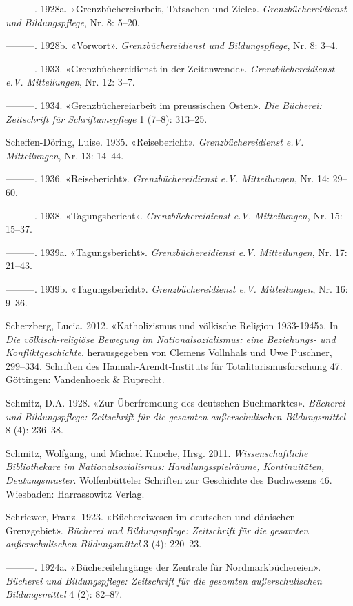 \documentclass[a4paper,
fontsize=11pt,
oneside,
numbers=noperiodatend,
parskip=half-,
bibliography=totoc,
final
]{scrartcl}
\begin{document}
---------. 1928a. «Grenzbüchereiarbeit, Tatsachen und Ziele».
\emph{Grenzbüchereidienst und Bildungspflege}, Nr. 8: 5--20.

---------. 1928b. «Vorwort». \emph{Grenzbüchereidienst und
Bildungspflege}, Nr. 8: 3--4.

---------. 1933. «Grenzbüchereidienst in der Zeitenwende».
\emph{Grenzbüchereidienst e.V. Mitteilungen}, Nr. 12: 3--7.

---------. 1934. «Grenzbüchereiarbeit im preussischen Osten». \emph{Die
Bücherei: Zeitschrift für Schriftumspflege} 1 (7--8): 313--25.

Scheffen-Döring, Luise. 1935. «Reisebericht». \emph{Grenzbüchereidienst
e.V. Mitteilungen}, Nr. 13: 14--44.

---------. 1936. «Reisebericht». \emph{Grenzbüchereidienst e.V.
Mitteilungen}, Nr. 14: 29--60.

---------. 1938. «Tagungsbericht». \emph{Grenzbüchereidienst e.V.
Mitteilungen}, Nr. 15: 15--37.

---------. 1939a. «Tagungsbericht». \emph{Grenzbüchereidienst e.V.
Mitteilungen}, Nr. 17: 21--43.

---------. 1939b. «Tagungsbericht». \emph{Grenzbüchereidienst e.V.
Mitteilungen}, Nr. 16: 9--36.

Scherzberg, Lucia. 2012. «Katholizismus und völkische Religion
1933-1945». In \emph{Die völkisch-religiöse Bewegung im
Nationalsozialismus: eine Beziehungs- und Konfliktgeschichte},
herausgegeben von Clemens Vollnhals und Uwe Puschner, 299--334.
Schriften des Hannah-Arendt-Instituts für Totalitarismusforschung 47.
Göttingen: Vandenhoeck \& Ruprecht.

Schmitz, D.A. 1928. «Zur Überfremdung des deutschen Buchmarktes».
\emph{Bücherei und Bildungspflege: Zeitschrift für die gesamten
außerschulischen Bildungsmittel} 8 (4): 236--38.

Schmitz, Wolfgang, und Michael Knoche, Hrsg. 2011.
\emph{Wissenschaftliche Bibliothekare im Nationalsozialismus:
Handlungsspielräume, Kontinuitäten, Deutungsmuster}. Wolfenbütteler
Schriften zur Geschichte des Buchwesens 46. Wiesbaden: Harrassowitz
Verlag.

Schriewer, Franz. 1923. «Büchereiwesen im deutschen und dänischen
Grenzgebiet». \emph{Bücherei und Bildungspflege: Zeitschrift für die
gesamten außerschulischen Bildungsmittel} 3 (4): 220--23.

---------. 1924a. «Büchereilehrgänge der Zentrale für
Nordmarkbüchereien». \emph{Bücherei und Bildungspflege: Zeitschrift für
die gesamten außerschulischen Bildungsmittel} 4 (2): 82--87.
\end{document}
